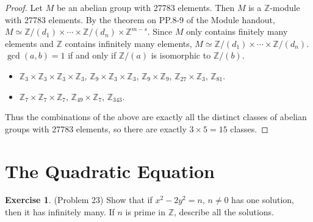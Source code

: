 \documentclass[12pt, psamsfonts]{amsart}
\theoremstyle{definition}
\newtheorem*{exer}{Exercise}
\theoremstyle{remark}
\numberwithin{equation}{section}
\begin{document}
\begin{proof}
  Let $M$ be an abelian group with 27783 elements.
  Then $M$ is a $\mathbb{Z}$-module with 27783 elements.
  By the theorem on PP.8-9 of the Module handout, $M \simeq \mathbb{Z}/(d_1) \times \cdots \times \mathbb{Z}/(d_n) \times \mathbb{Z}^{m - s}$.
  Since $M$ only contains finitely many elements and $\mathbb{Z}$ contains infinitely many elements, $M \simeq \mathbb{Z}/(d_1) \times \cdots \times \mathbb{Z}/(d_n)$.
  $\gcd(a, b) = 1$ if and only if $\mathbb{Z}/(a)$ is isomorphic to $\mathbb{Z}/(b)$.
  \begin{itemize}
    \item
      $\mathbb{Z}_3 \times \mathbb{Z}_3 \times \mathbb{Z}_3 \times \mathbb{Z}_3$, $\mathbb{Z}_9 \times \mathbb{Z}_3 \times \mathbb{Z}_3$,
      $\mathbb{Z}_9 \times \mathbb{Z}_9$, $\mathbb{Z}_{27} \times \mathbb{Z}_3$, $\mathbb{Z}_{81}$.
    \item
      $\mathbb{Z}_7 \times \mathbb{Z}_7 \times \mathbb{Z}_7$, $\mathbb{Z}_{49} \times \mathbb{Z}_7$, $\mathbb{Z}_{343}$.
  \end{itemize}
  Thus the combinations of the above are exactly all the distinct classes of abelian groups with 27783 elements, so there are exactly $3 \times 5 = 15$ classes.
\end{proof}

\section{The Quadratic Equation}

\begin{exer}{(Problem 23)}
  Show that if $x^2 - 2y^2 = n$, $n \ne 0$ has one solution, then it has infinitely many.
  If $n$ is prime in $\mathbb{Z}$, describe all the solutions.
\end{exer}
\end{document}
